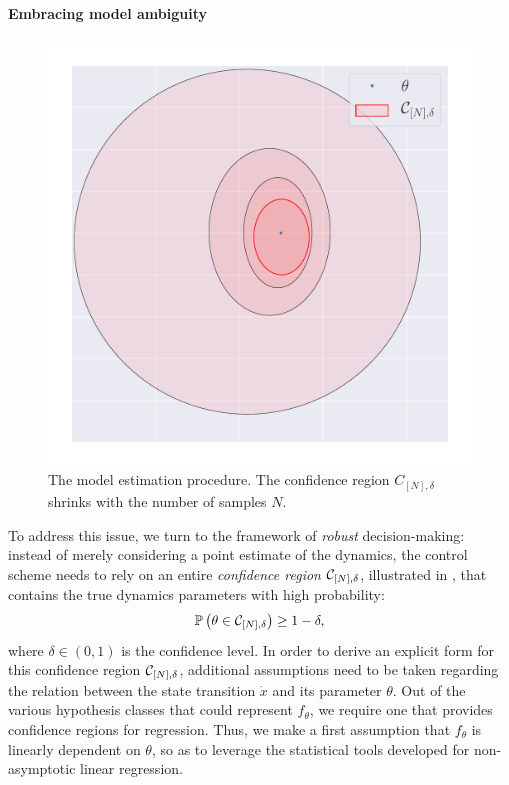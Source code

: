 
\paragraph{Embracing model ambiguity}
\begin{figure}[ht]
	\centering
	\includegraphics[trim={1cm 0 0 0}, clip, width=0.5\linewidth]{img/ellipsoid}
	\caption{The model estimation procedure. The confidence region $C_{[N],\delta}$ shrinks with the number of samples $N$.}
	\label{fig:estimation}
\end{figure}
To address this issue, we turn to the framework of \emph{robust} decision-making: instead of merely considering a point estimate of the dynamics, the control scheme needs to rely on an entire \emph{confidence region} $\mathcal{C}_{[N],\delta}$, illustrated in , that contains the true dynamics parameters with high probability:
\begin{align}
\mathbb{P}\left(\theta\in \mathcal{C}_{[N],\delta}\right) \geq 1-\delta,
\label{eq:confidence}
\end{align}
where $\delta\in(0,1)$ is the confidence level. 
In order to derive an explicit form for this confidence region $\mathcal{C}_{[N],\delta}$, additional assumptions need to be taken regarding the relation between the state transition $\dot{x}$ and its parameter $\theta$. Out of the various hypothesis classes that could represent $f_\theta$, we require one that provides confidence regions for regression. Thus, we make a first assumption that $f_\theta$ is linearly dependent on $\theta$, so as to leverage the statistical tools developed for non-asymptotic linear regression.

